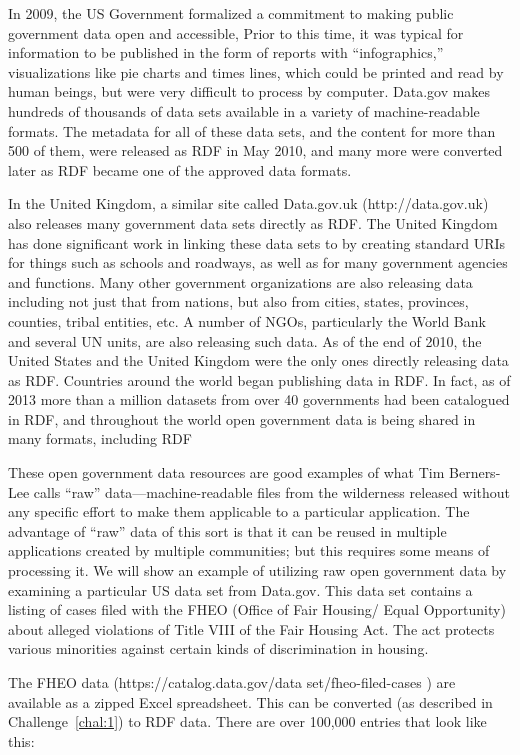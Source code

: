In 2009, the US Government formalized a commitment to making public
government data open and accessible, Prior to this time, it was typical
for information to be published in the form of reports with
``infographics,'' visualizations like pie charts and times lines, which
could be printed and read by human beings, but were very difficult to
process by computer. Data.gov makes hundreds of thousands of data sets
available in a variety of machine-readable formats. The metadata for all
of these data sets, and the content for more than 500 of them, were
released as RDF in May 2010, and many more were converted later as RDF became one of the approved data formats. 

In the United Kingdom, a similar site called Data.gov.uk
(http://data.gov.uk) also releases many government data sets directly as
RDF. The United Kingdom has done significant work in linking these data
sets to by creating standard URIs for things such as schools and
roadways, as well as for many government agencies and functions. Many
other government organizations are also releasing data including not
just that from nations, but also from cities, states, provinces,
counties, tribal entities, etc. A number of NGOs, particularly the World
Bank and several UN units, are also releasing such data. As of the end
of 2010, the United States and the United Kingdom were the only ones
directly releasing data as RDF.  Countries around the 
world began publishing data in RDF.  In fact, as of 2013 more than a million datasets from over 40 governments 
had been catalogued in RDF, and throughout the world open government data is being shared in many formats, including RDF

These open government data resources are good examples of what Tim
Berners-Lee calls ``raw'' data---machine-readable files from the
wilderness released without any specific effort to make them applicable
to a particular application. The advantage of ``raw'' data of this sort
is that it can be reused in multiple applications created by multiple
communities; but this requires some means of processing it. We will show
an example of utilizing raw open government data by examining a
particular US data set from Data.gov. This data set contains a listing
of cases filed with the FHEO (Office of Fair Housing/ Equal Opportunity)
about alleged violations of Title VIII of the Fair Housing Act. The act
protects various minorities against certain kinds of discrimination in
housing.

The FHEO data (https://catalog.data.gov/data set/fheo-filed-cases \cite{FHEO}) are available 
as a zipped Excel spreadsheet. This can be converted (as described in Challenge~\ref{chal:1}) to RDF data. 
There are over
100,000 entries that look like this:

